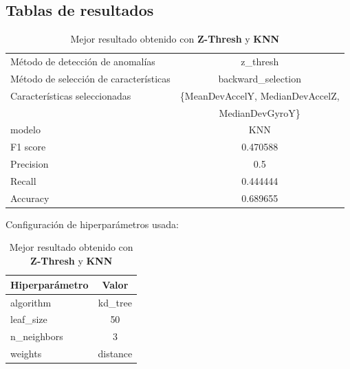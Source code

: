 \begin{appendices}
	\newpage
	\section*{Tablas de resultados}
		
		\begin{table}[htb]
			\centering
			\caption{Mejor resultado obtenido con \textbf{Z-Thresh} y \textbf{KNN}}
			\label{table:17}
			\begin{tabular}{lc}
				\toprule
				\midrule
					  Método de detección de anomalías &                                         z\_thresh \\
				Método de selección de características &                               backward\_selection \\
						 Características seleccionadas & \{MeanDevAccelY, MedianDevAccelZ,    \\
						 							   &									MedianDevGyroY\} \\
												modelo &                                              KNN \\
											  F1 score &                                         0.470588 \\
											 Precision &                                              0.5 \\
												Recall &                                         0.444444 \\
											  Accuracy &                                         0.689655 \\
				\bottomrule
			\end{tabular}
			\newline
			\newline
			Configuración de hiperparámetros usada:
				\begin{tabular}{lc}
				\toprule
				Hiperparámetro &    Valor \\
				\midrule
					 algorithm &  kd\_tree \\
					 leaf\_size &       50 \\
				   n\_neighbors &        3 \\
					   weights & distance \\
				\bottomrule
				\end{tabular}
			
			
		\end{table}


\end{appendices}
